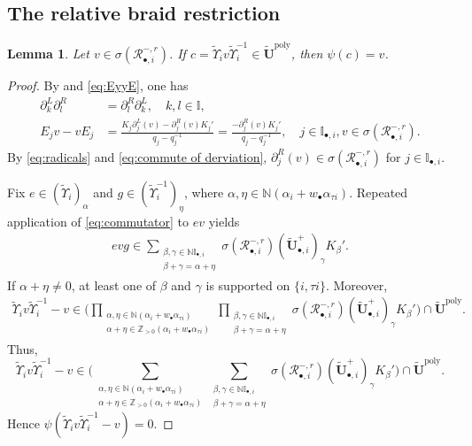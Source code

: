 \documentclass[a4paper,reqno,12pt]{amsart}
\numberwithin{equation}{section}
\newtheorem{lemma}[proposition]{Lemma}
\theoremstyle{definition}
\theoremstyle{plain}
\theoremstyle{definition}
\def\N{\mathbb N}
\def\Z{\mathbb Z}
\def\I{\mathbb I}
\def\bIi{\I_{\bullet,i}}
\def\bw{w_\bullet}
\def\tU{\widetilde{\mathbf U}}
\def \tbiU{\tU_{\bullet,i}}
\def\tfX{\widetilde\Upsilon}
\def\cR{\mathcal R}
\newcommand{\poly}{\mathrm{poly}}
\begin{document}
\subsection{The relative braid restriction}
\begin{lemma}\label{lem:conjugation}
Let $v\in\sigma(\cR_{\bullet,i}^{-,r})$. If
$c=\tfX_i v\tfX_i^{-1}\in\tU^\poly$, then $\psi(c)=v$.
\end{lemma}

\begin{proof}
By \cite[Lemma 10.1]{J96} and \eqref{eq:EyyE}, one has
\begin{align}
\partial_k^L \partial_l^R&=\partial_l^R\partial_k^L,\quad k,l\in\I,\label{eq:commute of derviation}\\
E_j v - v E_j &= \frac{K_j \partial_j^L(v)-\partial_j^R(v)K_j'}{q_j-q_j^{-1}}=\frac{-\partial_j^R(v)K_j'}{q_j-q_j^{-1}},\quad j\in\bIi, v\in \sigma(\cR_{\bullet,i}^{-,r}).
\label{eq:commutator}
\end{align}
By \eqref{eq:radicals} and \eqref{eq:commute of derviation}, $\partial_j^R(v)\in\sigma(\cR_{\bullet,i}^{-,r})$ for $j\in\bIi$.

 Fix $e\in(\tfX_i)_{\alpha}$ and $g\in(\tfX_i^{-1})_{\eta}$, where $\alpha,\eta\in\N(\alpha_i+\bw\alpha_{\tau i})$. Repeated application of \eqref{eq:commutator} to $ev$ yields
 \begin{align}
evg\in\sum_{\substack{\beta,\gamma\in\N \bIi\\
\beta+\gamma=\alpha+\eta}}
\sigma(\cR_{\bullet,i}^{-,r})(\tbiU^+)_{\gamma}K_\beta'.
\label{eq:normal-ordering}
\end{align}
If $\alpha+\eta\neq0$, at least one of $\beta$ and $\gamma$ is supported on $\{i,\tau i\}$. Moreover,
\begin{align*}
 \tfX_i v\tfX_i^{-1}-v\in\Big(\prod_{\substack{\alpha,\eta\in\N(\alpha_i+\bw\alpha_{\tau i})\\ \alpha+\eta\in\Z_{>0}(\alpha_i+\bw\alpha_{\tau i})}}\prod_{\substack{\beta,\gamma\in\N \bIi\\
\beta+\gamma=\alpha+\eta}}\sigma(\cR_{\bullet,i}^{-,r})(\tbiU^+)_{\gamma}K_\beta'\Big)\cap\tU^\poly.   
\end{align*}
Thus,
\begin{equation*}
  \tfX_i v\tfX_i^{-1}-v\in\Big(\sum_{\substack{\alpha,\eta\in\N(\alpha_i+\bw\alpha_{\tau i})\\ \alpha+\eta\in\Z_{>0}(\alpha_i+\bw\alpha_{\tau i})}}\sum_{\substack{\beta,\gamma\in\N \bIi\\
\beta+\gamma=\alpha+\eta}}\sigma(\cR_{\bullet,i}^{-,r})(\tbiU^+)_{\gamma}K_\beta'\Big)\cap\tU^\poly.  
\end{equation*}
 Hence $\psi(\tfX_i v\tfX_i^{-1}-v)=0$.
\end{proof}
\end{document}
